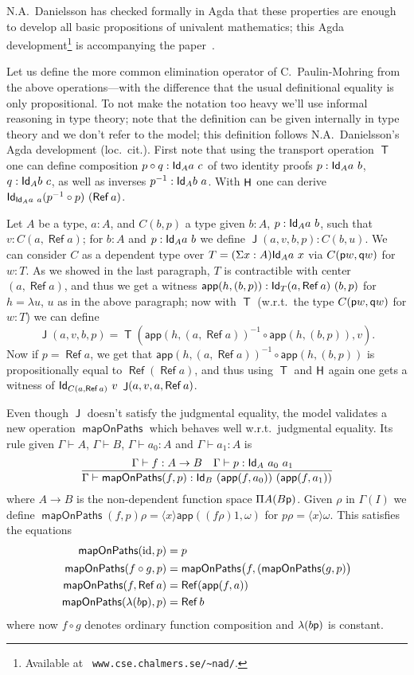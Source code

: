 \documentclass[10pt,a4paper]{article}
\DeclareMathOperator{\Ref}{\mathsf{Ref}}
\DeclareMathOperator{\Transp}{\mathsf{T}}
\DeclareMathOperator{\HH}{{\sf H}}
\DeclareMathOperator{\Jel}{\mathsf{J}}
\newcommand{\Id}{{\sf Id}}
\newcommand{\app}{\mathsf{app}}
\newcommand{\pp}{{\sf p}}
\newcommand{\qq}{{\sf q}}
\newcommand{\bind}[2]{{\langle}#1{\rangle}#2}
\DeclareMathOperator{\mapOnPaths}{\mathsf{mapOnPaths}}
\begin{document}
N.A.~Danielsson has checked formally in Agda that these properties are
enough to develop all basic propositions of univalent mathematics;
this Agda development\footnote{Available at {\tt
    www.cse.chalmers.se/\textasciitilde nad/}.} is accompanying the
paper~\cite{CoquandDanielsson}.

Let us define the more common elimination operator of C.\
Paulin-Mohring from the above operations---with the difference that
the usual definitional equality is only propositional.  To not make
the notation too heavy we'll use informal reasoning in type theory;
note that the definition can be given internally in type theory and we
don't refer to the model; this definition follows N.A.\ Danielsson's
Agda development (loc.\ cit.).  First note that using the transport
operation $\Transp$ one can define composition $p \circ q : \Id_A a~c$
of two identity proofs $p : \Id_A a~b$, $q : \Id_A b~c$, as well as
inverses $p^{-1} : \Id_A b~a$.  With $\HH$ one can derive $\Id_{\Id_A
  a~a} (p^{-1} \circ p)~(\Ref a)$.

Let $A$ be a type, $a : A$, and $C (b,p)$ a type given $b : A$, $p :
\Id_A a~b$, such that $v : C (a, \Ref a)$; for $b : A$ and $p :
\Id_{A} a~b$ we define $\Jel (a,v,b,p) : C (b,u)$.  We can consider
$C$ as a dependent type over $T = (\Sigma x : A) \Id_A a~x$ via $C
(\pp w, \qq w)$ for $w : T$.  As we showed in the last paragraph, $T$
is contractible with center $(a, \Ref a)$, and thus we get a witness
$\app (h, (b,p)) : \Id_T (a,\Ref a)~(b,p)$ for $h = \lambda u$, $u$ as
in the above paragraph; now with $\Transp$ (w.r.t.\ the type $C (\pp
w, \qq w)$ for $w : T$) we can define
\[
\Jel (a,v,b,p) = \Transp (\app (h, (a,\Ref a))^{-1} \circ \app
(h,(b,p)), v).
\]
Now if $p = \Ref a$, we get that $\app (h, (a,\Ref a))^{-1} \circ \app
(h,(b,p))$ is propositionally equal to $\Ref (\Ref a)$, and thus using
$\Transp$ and $\HH$ again one gets a witness of $\Id_{C (a, \Ref a)}~
v~\Jel (a,v,a,\Ref a)$.

Even though $\Jel$ doesn't satisfy the judgmental equality, the model
validates a new operation $\mapOnPaths$ which behaves well w.r.t.\
judgmental equality.  Its rule given $\Gamma \vdash A$, $\Gamma \vdash
B$, $\Gamma \vdash a_0 : A$ and $\Gamma \vdash a_1 : A$ is
\[
\frac {\quad \Gamma \vdash f : A \to B \quad \Gamma \vdash p :
  \Id_A~a_0~a_1} {\Gamma \vdash \mapOnPaths (f, p) : \Id_B~(\app
  (f,a_0))~(\app (f,a_1))}
\]
where $A \to B$ is the non-dependent function space $\Pi A (B \pp)$.
Given $\rho$ in $\Gamma (I)$ we define $\mapOnPaths (f, p) \rho =
\bind{x} \app ((f \rho) 1, \omega)$ for $p \rho = \bind x \omega$.
This satisfies the equations
\begin{align*}
  \mapOnPaths (\mathrm{id}, p) & = p \\
  \mapOnPaths (f \circ g, p) &= \mapOnPaths \bigl( f, (\mapOnPaths
  (g, p) \bigr)\\
  \mapOnPaths (f, \Ref a) &= \Ref (\app (f, a))\\
  \mapOnPaths (\lambda (b \pp), p) &= \Ref b
\end{align*}
where now $f \circ g$ denotes ordinary function composition and
$\lambda (b \pp)$ is constant.
\end{document}
